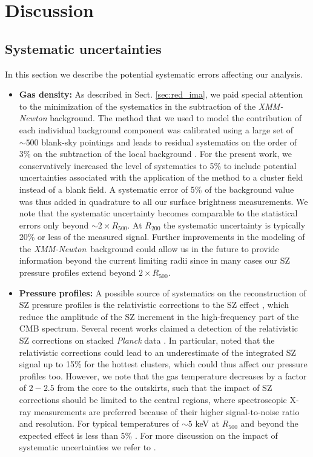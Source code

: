 \documentclass[traditabstract   ]{aa} %
\newcommand{\xmm}{{\it XMM-Newton}}
\begin{document}
\section{Discussion}
\label{sec:disc}

\subsection{Systematic uncertainties}

In this section we describe the potential systematic errors affecting our analysis. 

\begin{itemize}
\item \textbf{Gas density:} As described in Sect. \ref{sec:red_ima}, we paid special attention to the minimization of the systematics in the subtraction of the \emph{XMM-Newton} background. The method that we used to model the contribution of each individual background component was calibrated using a large set of $\sim500$ blank-sky pointings and leads to residual systematics on the order of 3\% on the subtraction of the local background \citep[see Appendix A in][]{ghirardini18}. For the present work, we conservatively increased the level of systematics to 5\% to include potential uncertainties associated with the application of the method to a cluster field instead of a blank field. A systematic error of 5\% of the background value was thus added in quadrature to all our surface brightness measurements. We note that the systematic uncertainty becomes comparable to the statistical errors only beyond $\sim2\times R_{500}$. At $R_{200}$ the systematic uncertainty is typically 20\% or less of the measured signal. Further improvements in the modeling of the \xmm\ background could allow us in the future to provide information beyond the current limiting radii since in many cases our SZ pressure profiles extend beyond $2\times R_{500}$.

\item \textbf{Pressure profiles:} A possible source of systematics on the reconstruction of SZ pressure profiles is the relativistic corrections to the SZ effect \citep{itoh98}, which reduce the amplitude of the SZ increment in the high-frequency part of the CMB spectrum. Several recent works claimed a detection of the relativistic SZ corrections on stacked \emph{Planck} data \citep{hurier16,erler18}. In particular, \citet{erler18} noted that the relativistic corrections could lead to an underestimate of the integrated SZ signal up to 15\% for the hottest clusters, which could thus affect our pressure profiles too. However, we note that the gas temperature decreases by a factor of $2-2.5$ from the core to the outskirts, such that the impact of SZ corrections should be limited to the central regions, where spectroscopic X-ray measurements are preferred because of their higher signal-to-noise ratio and resolution. For typical temperatures of $\sim5$ keV at $R_{500}$ and beyond the expected effect is less than 5\% \citep{erler18}. For more discussion on the impact of systematic uncertainties we refer to \citet{planck+13}. 


\end{itemize}
\end{document}
